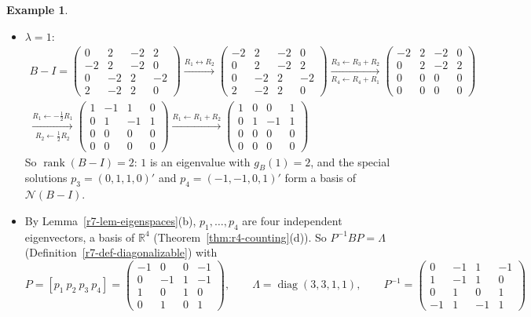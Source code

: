 \documentclass[12pt]{article}
\newcommand{\R}{\mathbb R}
\DeclareMathOperator{\diag}{diag}
\DeclareMathOperator{\rank}{rank}
\theoremstyle{definition}
\newtheorem{example}[theorem]{Example}
\begin{document}
\begin{example}
\begin{itemize}
\item \(\lambda=1\):
\[
\begin{gathered}
B-I=\begin{pmatrix}0&2&-2&2\\-2&2&-2&0\\0&-2&2&-2\\2&-2&2&0\end{pmatrix}
\xrightarrow{R_1\leftrightarrow R_2}
\begin{pmatrix}-2&2&-2&0\\0&2&-2&2\\0&-2&2&-2\\2&-2&2&0\end{pmatrix}
\xrightarrow[R_4\leftarrow R_4+R_1]{R_3\leftarrow R_3+R_2}
\begin{pmatrix}-2&2&-2&0\\0&2&-2&2\\0&0&0&0\\0&0&0&0\end{pmatrix}
\\
\xrightarrow[R_2\leftarrow\frac12R_2]{R_1\leftarrow-\frac12R_1}
\begin{pmatrix}1&-1&1&0\\0&1&-1&1\\0&0&0&0\\0&0&0&0\end{pmatrix}
\xrightarrow{R_1\leftarrow R_1+R_2}
\begin{pmatrix}1&0&0&1\\0&1&-1&1\\0&0&0&0\\0&0&0&0\end{pmatrix}
\end{gathered}
\]
So \(\rank(B-I)=2\): \(1\) is an eigenvalue with \(g_B(1)=2\), and the special solutions \(p_3=(0,1,1,0)'\) and
\(p_4=(-1,-1,0,1)'\) form a basis of \(\mathcal N(B-I)\).
\item By Lemma~\ref{r7-lem-eigenspaces}(b), \(p_1,\dots,p_4\) are four independent eigenvectors, a basis of \(\R^4\)
(Theorem~\ref{thm:r4-counting}(d)). So \(P^{-1}BP=\Lambda\) (Definition~\ref{r7-def-diagonalizable}) with
\[
P=[p_1\ p_2\ p_3\ p_4]=\begin{pmatrix}-1&0&0&-1\\0&-1&1&-1\\1&0&1&0\\0&1&0&1\end{pmatrix},\qquad
\Lambda=\diag(3,3,1,1),\qquad
P^{-1}=\begin{pmatrix}0&-1&1&-1\\1&-1&1&0\\0&1&0&1\\-1&1&-1&1\end{pmatrix}
\]
\end{itemize}
\end{example}
\end{document}
